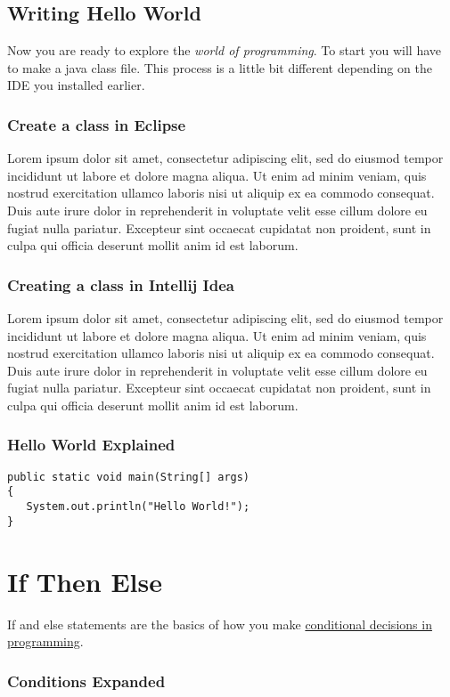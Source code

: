 \documentclass{article}
\begin{document}
\subsection{Writing Hello World}
Now you are ready to explore the \emph{world of programming}. To start you will have
to make a java class file. This process is a little bit different depending on the IDE you installed earlier.

\subsubsection{Create a class in Eclipse}
Lorem ipsum dolor sit amet, consectetur adipiscing elit, sed do eiusmod tempor incididunt ut labore et dolore magna aliqua. Ut enim ad minim veniam, quis nostrud exercitation ullamco laboris nisi ut aliquip ex ea commodo consequat. Duis aute irure dolor in reprehenderit in voluptate velit esse cillum dolore eu fugiat nulla pariatur. Excepteur sint occaecat cupidatat non proident, sunt in culpa qui officia deserunt mollit anim id est laborum.



\subsubsection{Creating a class in Intellij Idea}
Lorem ipsum dolor sit amet, consectetur adipiscing elit, sed do eiusmod tempor incididunt ut labore et dolore magna aliqua. Ut enim ad minim veniam, quis nostrud exercitation ullamco laboris nisi ut aliquip ex ea commodo consequat. Duis aute irure dolor in reprehenderit in voluptate velit esse cillum dolore eu fugiat nulla pariatur. Excepteur sint occaecat cupidatat non proident, sunt in culpa qui officia deserunt mollit anim id est laborum.



\subsubsection{Hello World Explained}
\begin{lstlisting}
public static void main(String[] args)
{
   System.out.println("Hello World!");
}
\end{lstlisting}




\section{If Then Else}
If and else statements are the basics of how you make \href{https://wikipedia.org/wiki/Conditional_(computer_programming)}{conditional decisions in programming}.


\subsubsection{Conditions Expanded}
\end{document}
